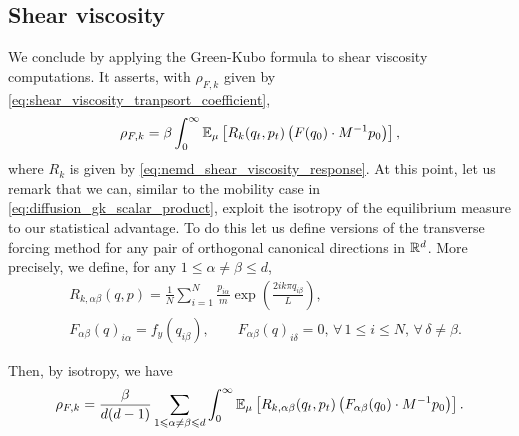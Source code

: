 \subsection{Shear viscosity}
We conclude by applying the Green-Kubo formula to shear viscosity computations. It asserts, with $\rho_{F,k}$ given by \eqref{eq:shear_viscosity_tranpsort_coefficient},
\begin{equation}
    \label{eq:green_kubo_viscosity}
    \rho_{F,k}=\beta\int_0^\infty \mathbb{E}_\mu\left[R_k(q_t,p_t)\left(F(q_0)\cdot M^{-1}p_0\right)\right],
\end{equation}
where $R_k$ is given by \eqref{eq:nemd_shear_viscosity_response}.
At this point, let us remark that we can, similar to the mobility case in \eqref{eq:diffusion_gk_scalar_product}, exploit the isotropy of the equilibrium measure to our statistical advantage.
To do this let us define versions of the transverse forcing method for any pair of orthogonal canonical directions in $\mathbb{R}^d$. More precisely,
we define, for any $1\leq \alpha \neq \beta \leq d$,
\begin{align*}
    &R_{k,\alpha\beta}(q,p)=\frac{1}N\sum_{i=1}^N\frac{p_{i\alpha}}{m}\exp\left(\frac{2ik\pi q_{i\beta}}{L}\right),\\
    &F_{\alpha\beta}(q)_{i\alpha}=f_y(q_{i\beta}),\qquad F_{\alpha\beta}(q)_{i\delta}=0,\,\forall\, 1\leq i\leq N,\, \forall\, \delta \neq \beta.
\end{align*}

Then, by isotropy, we have
\begin{equation}
    \label{eq:green_kubo_viscosity_isotropic}
    \rho_{F,k}=\frac{\beta}{d(d-1)}\sum_{1\leqslant \alpha\neq\beta \leqslant d}\int_0^\infty\mathbb{E}_\mu\left[R_{k,\alpha\beta}(q_t,p_t)\left(F_{\alpha\beta}(q_0)\cdot M^{-1}p_0\right)\right].
\end{equation}

